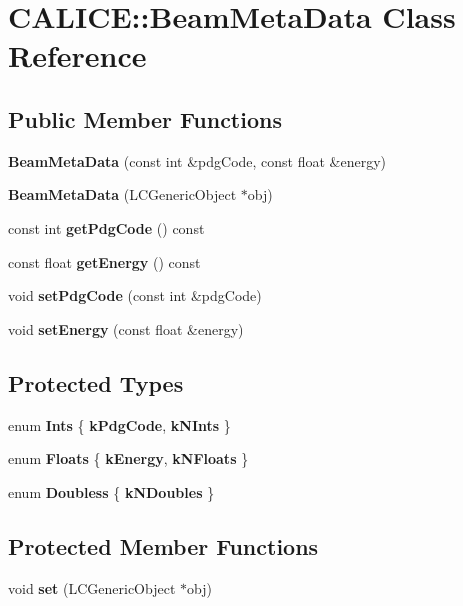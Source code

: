 \section{CALICE::BeamMetaData Class Reference}
\label{classCALICE_1_1BeamMetaData}
\subsection*{Public Member Functions}
\begin{DoxyCompactItemize}
\item 
{\bfseries BeamMetaData} (const int \&pdgCode, const float \&energy)\label{classCALICE_1_1BeamMetaData_ac22d51f9f4ac31beae53b0ace01fafd0}

\item 
{\bfseries BeamMetaData} (LCGenericObject $\ast$obj)\label{classCALICE_1_1BeamMetaData_ac0f69e98cee9d162ba93f5620d1e05e6}

\item 
const int {\bfseries getPdgCode} () const \label{classCALICE_1_1BeamMetaData_a71fc431fc1c25ca0d310a8a3980c4656}

\item 
const float {\bfseries getEnergy} () const \label{classCALICE_1_1BeamMetaData_a7b6054aeeeee3ad83f468466f7835c7e}

\item 
void {\bfseries setPdgCode} (const int \&pdgCode)\label{classCALICE_1_1BeamMetaData_a73a59e54ded8ad2f88f1ce894d56cef2}

\item 
void {\bfseries setEnergy} (const float \&energy)\label{classCALICE_1_1BeamMetaData_a72048e8487e9c9711cc0edf98367a7fd}

\end{DoxyCompactItemize}
\subsection*{Protected Types}
\begin{DoxyCompactItemize}
\item 
enum {\bfseries Ints} \{ {\bfseries kPdgCode}, 
{\bfseries kNInts}
 \}
\item 
enum {\bfseries Floats} \{ {\bfseries kEnergy}, 
{\bfseries kNFloats}
 \}
\item 
enum {\bfseries Doubless} \{ {\bfseries kNDoubles}
 \}
\end{DoxyCompactItemize}
\subsection*{Protected Member Functions}
\begin{DoxyCompactItemize}
\item 
void {\bfseries set} (LCGenericObject $\ast$obj)\label{classCALICE_1_1BeamMetaData_a70518a4d2e7e10c1e476dccd9cf82b4f}

\end{DoxyCompactItemize}
